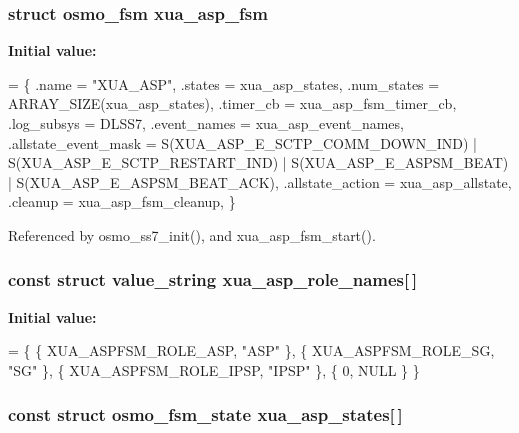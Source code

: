 \subsubsection[{xua\+\_\+asp\+\_\+fsm}]{\setlength{\rightskip}{0pt plus 5cm}struct osmo\+\_\+fsm xua\+\_\+asp\+\_\+fsm}\label{xua__asp__fsm_8c_a14fb53dcfac1cdad274b0c88192517dd}
{\bfseries Initial value\+:}
\begin{DoxyCode}
= \{
        .name = \textcolor{stringliteral}{"XUA\_ASP"},
        .states = xua_asp_states,
        .num\_states = ARRAY\_SIZE(xua_asp_states),
        .timer\_cb = xua_asp_fsm_timer_cb,
        .log\_subsys = DLSS7,
        .event\_names = xua_asp_event_names,
        .allstate\_event\_mask = S(XUA_ASP_E_SCTP_COMM_DOWN_IND) |
                               S(XUA_ASP_E_SCTP_RESTART_IND) |
                               S(XUA_ASP_E_ASPSM_BEAT) |
                               S(XUA_ASP_E_ASPSM_BEAT_ACK),
        .allstate\_action = xua_asp_allstate,
        .cleanup = xua_asp_fsm_cleanup,
\}
\end{DoxyCode}


Referenced by osmo\+\_\+ss7\+\_\+init(), and xua\+\_\+asp\+\_\+fsm\+\_\+start().

\subsubsection[{xua\+\_\+asp\+\_\+role\+\_\+names}]{\setlength{\rightskip}{0pt plus 5cm}const struct value\+\_\+string xua\+\_\+asp\+\_\+role\+\_\+names[$\,$]\hspace{0.3cm}{\ttfamily [static]}}\label{xua__asp__fsm_8c_ae910c23862f3f06df49bef7a8ef69814}
{\bfseries Initial value\+:}
\begin{DoxyCode}
= \{
        \{ XUA_ASPFSM_ROLE_ASP,  \textcolor{stringliteral}{"ASP"} \},
        \{ XUA_ASPFSM_ROLE_SG,   \textcolor{stringliteral}{"SG"} \},
        \{ XUA_ASPFSM_ROLE_IPSP, \textcolor{stringliteral}{"IPSP"} \},
        \{ 0, NULL \}
\}
\end{DoxyCode}
\subsubsection[{xua\+\_\+asp\+\_\+states}]{\setlength{\rightskip}{0pt plus 5cm}const struct osmo\+\_\+fsm\+\_\+state xua\+\_\+asp\+\_\+states[$\,$]\hspace{0.3cm}{\ttfamily [static]}}\label{xua__asp__fsm_8c_ad09082ebb4ac6dff6ec2e7cf8e418437}
